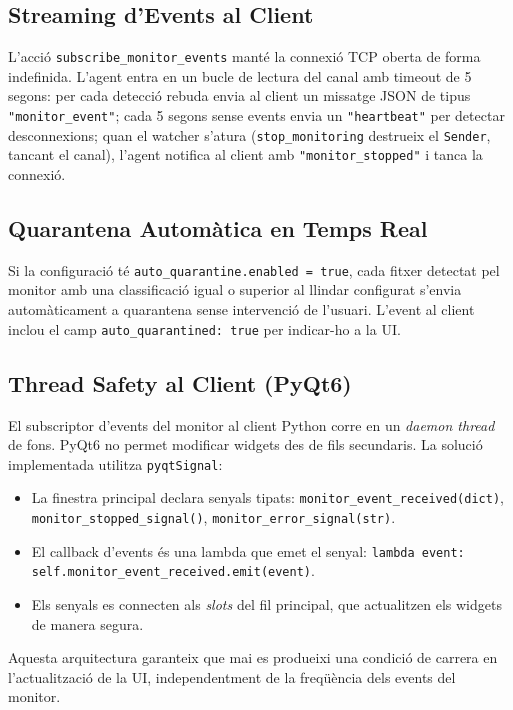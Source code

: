 \documentclass[12pt,a4paper]{report}
\begin{document}
\subsection{Streaming d'Events al Client}
L'acció \texttt{subscribe\_monitor\_events} manté la connexió TCP oberta de forma indefinida. L'agent entra en un bucle de lectura del canal amb timeout de 5 segons: per cada detecció rebuda envia al client un missatge JSON de tipus \texttt{"monitor\_event"}; cada 5 segons sense events envia un \texttt{"heartbeat"} per detectar desconnexions; quan el watcher s'atura (\texttt{stop\_monitoring} destrueix el \texttt{Sender}, tancant el canal), l'agent notifica al client amb \texttt{"monitor\_stopped"} i tanca la connexió.

\subsection{Quarantena Automàtica en Temps Real}
Si la configuració té \texttt{auto\_quarantine.enabled = true}, cada fitxer detectat pel monitor amb una classificació igual o superior al llindar configurat s'envia automàticament a quarantena sense intervenció de l'usuari. L'event al client inclou el camp \texttt{auto\_quarantined: true} per indicar-ho a la UI.

\subsection{Thread Safety al Client (PyQt6)}
El subscriptor d'events del monitor al client Python corre en un \textit{daemon thread} de fons. PyQt6 no permet modificar widgets des de fils secundaris. La solució implementada utilitza \texttt{pyqtSignal}:
\begin{itemize}
    \item La finestra principal declara senyals tipats: \texttt{monitor\_event\_received(dict)}, \texttt{monitor\_stopped\_signal()}, \texttt{monitor\_error\_signal(str)}.
    \item El callback d'events és una lambda que emet el senyal: \texttt{lambda event: self.monitor\_event\_received.emit(event)}.
    \item Els senyals es connecten als \textit{slots} del fil principal, que actualitzen els widgets de manera segura.
\end{itemize}
Aquesta arquitectura garanteix que mai es produeixi una condició de carrera en l'actualització de la UI, independentment de la freqüència dels events del monitor.
\end{document}
